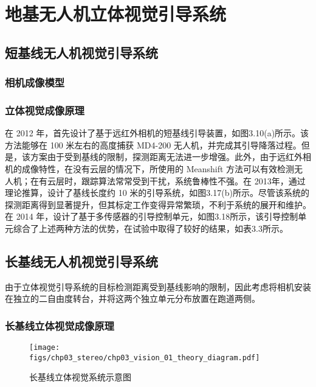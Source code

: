 \chapter{地基无人机立体视觉引导系统}

\section{短基线无人机视觉引导系统}
\subsection{相机成像模型}

\subsection{立体视觉成像原理}



在 2012 年，首先设计了基于远红外相机的短基线引导装置，如图3.10(a)所示。该方法能够在 100 米左右的高度捕获 MD4-200 无人机，并完成其引导降落过程。但是，该方案由于受到基线的限制，探测距离无法进一步增强。此外，由于远红外相机的成像特性，在没有云层的情况下，所使用的 Meanshift 方法可以有效检测无人机；在有云层时，跟踪算法常常受到干扰，系统鲁棒性不强。在 2013年，通过理论推算，设计了基线长度约 10 米的引导系统，如图3.17(b)所示。尽管该系统的探测距离得到显著提升，但其标定工作变得异常繁琐，不利于系统的展开和维护。在 2014 年，设计了基于多传感器的引导控制单元，如图3.18所示，该引导控制单元综合了上述两种方法的优势，在试验中取得了较好的结果，如表3.3所示。

\section{长基线无人机视觉引导系统}
由于立体视觉引导系统的目标检测距离受到基线影响的限制，因此考虑将相机安装在独立的二自由度转台，并将这两个独立单元分布放置在跑道两侧。



\subsection{长基线立体视觉成像原理}


\begin{figure}[!tb]
	\centering
	\texttt{[image: figs/chp03\_stereo/chp03\_vision\_01\_theory\_diagram.pdf]}	
	\caption{长基线立体视觉系统示意图}
	\label{fig:chp03_vision_01_theory_diagram}
\end{figure}

